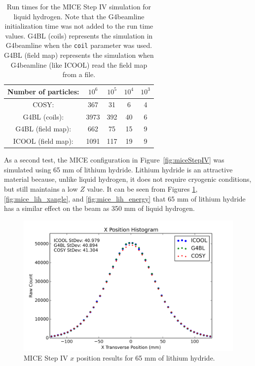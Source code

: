 \begin{table}
\caption[Run times for the MICE Step IV simulation.]{Run times for the MICE Step IV simulation for liquid hydrogen. Note that the G4beamline initialization time was not added to the run time values. G4BL (coils) represents the simulation in G4beamline when the \texttt{coil} parameter was used. G4BL (field map) represents the simulation when G4beamline (like ICOOL) read the field map from a file.}
\begin{center}
\begin{tabularx}{0.55\textwidth}{ccccc}
\hline \hline
Number of particles: & $10^6$ & $10^5$ & $10^4$ & $10^3$\\
\hline
COSY: & 367 & 31 & 6 & 4\vspace{-12pt}\\
G4BL (coils): & 3973 & 392 & 40 & 6\vspace{-12pt}\\
G4BL (field map): & 662 & 75 & 15 & 9\vspace{-12pt}\\
ICOOL (field map): & 1091 & 117 & 19 & 9\\
\hline
\end{tabularx}
\end{center}
\label{tbl:mice_times}
\end{table}

As a second test, the MICE configuration in Figure~\ref{fig:miceStepIV} was simulated using 65 mm of lithium hydride. Lithium hydride is an attractive material because, unlike liquid hydrogen, it does not require cryogenic conditions, but still maintains a low $Z$ value. It can be seen from Figures \ref{fig:mice_lih_x}, \ref{fig:mice_lih_xangle}, and \ref{fig:mice_lih_energy} that 65 mm of lithium hydride has a similar effect on the beam as 350 mm of liquid hydrogen.

\begin{figure}[H]
  \centering
    \includegraphics[width=\textwidth]{MICE data/LiH/x} 
  \caption{MICE Step IV $x$ position results for 65 mm of lithium hydride.}
  \label{fig:mice_lih_x}
\end{figure}


